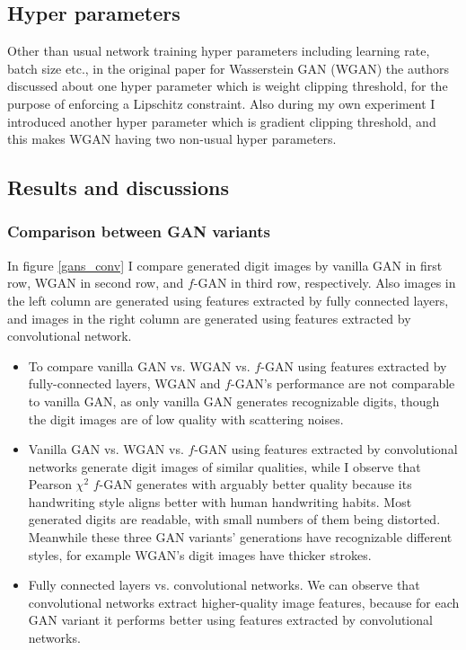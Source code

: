 \documentclass[10pt,twocolumn,letterpaper]{article}
\begin{document}
\subsection{Hyper parameters}
\label{hyper_parameters}
Other than usual network training hyper parameters including learning rate, batch size etc., in the original paper for Wasserstein GAN (WGAN) the authors discussed about one hyper parameter which is weight clipping threshold, for the purpose of enforcing a Lipschitz constraint. Also during my own experiment I introduced another hyper parameter which is gradient clipping threshold, and this makes WGAN having two non-usual hyper parameters.

\subsection{Results and discussions}
\label{results}
\subsubsection{Comparison between GAN variants}
\label{gan_variants}
In figure \ref{gans_conv} I compare generated digit images by vanilla GAN in first row, WGAN in second row, and $f$-GAN in third row, respectively. Also images in the left column are generated using features extracted by fully connected layers, and images in the right column are generated using features extracted by convolutional network. 
\begin{itemize}
    \item To compare vanilla GAN vs. WGAN vs. $f$-GAN using features extracted by fully-connected layers, WGAN and $f$-GAN's performance are not comparable to vanilla GAN, as only vanilla GAN generates recognizable digits, though the digit images are of low quality with scattering noises.
    \item Vanilla GAN vs. WGAN vs. $f$-GAN using features extracted by convolutional networks generate digit images of similar qualities, while I observe that Pearson $\chi^2$ $f$-GAN generates with arguably better quality because its handwriting style aligns better with human handwriting habits. Most generated digits are readable, with small numbers of them being distorted. Meanwhile these three GAN variants' generations have recognizable different styles, for example WGAN's digit images have thicker strokes.
    \item Fully connected layers vs. convolutional networks. We can observe that convolutional networks extract higher-quality image features, because for each GAN variant it performs better using features extracted by convolutional networks.
\end{itemize}
\end{document}
